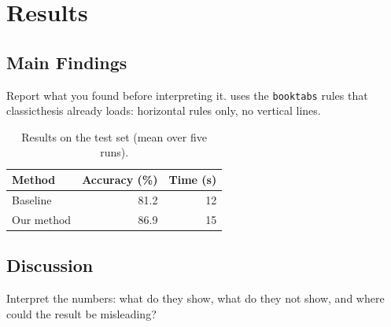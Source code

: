\chapter{Results}\label{ch:results}

\section{Main Findings}
Report what you found before interpreting it.  uses the \texttt{booktabs}
rules that classicthesis already loads: horizontal rules only, no vertical lines.

\begin{table}[bth]
  \centering
  \caption[Short title for the list of tables]{Results on the test set (mean over five runs).}\label{tab:results}
  \begin{tabular}{@{}lrr@{}}
    \toprule
    Method & Accuracy (\%) & Time (s) \\
    \midrule
    Baseline & 81.2 & 12 \\
    Our method & 86.9 & 15 \\
    \bottomrule
  \end{tabular}
\end{table}

\section{Discussion}
Interpret the numbers: what do they show, what do they not show, and where could the
result be misleading?
